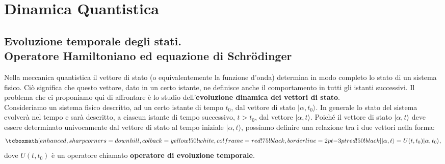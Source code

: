 \documentclass[a4paper,12pt,oneside]{book}
\newcommand*{\myfont}{\fontfamily{ppl}\selectfont}
\begin{document}
\fancypagestyle{plain}{%
\fancyhf{} %
\fancyfoot[C]{\bfseries \myfont{\thepage}} %
\renewcommand{\headrulewidth}{0pt}
\renewcommand{\footrulewidth}{0pt}}

\fancypagestyle{VS}{
\headheight = 15pt
\lhead[\myfont{\textit{\textbf{\thechapter\nouppercase{\leftmark}}}}]{\myfont{\textit{\textbf{\nouppercase{\leftmark}}}}}
\chead[]{}
\rhead[\myfont{\textbf{\thepage}}]{\myfont{\textbf{\thepage}}}

\lfoot[]{}
\cfoot[]{}
\rfoot[]{}
}



\pagestyle{VS}
\setcounter{chapter}{7}
\setcounter{page}{91}
\chapter{Dinamica Quantistica}
\section[Evoluzione temporale degli stati]{Evoluzione temporale degli stati.\\Operatore Hamiltoniano ed equazione di Schr\"{o}dinger}
Nella meccanica quantistica il vettore di stato (o equivalentemente la funzione d'onda) determina in modo completo lo stato di un sistema fisico. Ciò significa che questo vettore, dato in un certo istante, ne definisce anche il comportamento in tutti gli istanti successivi. Il problema che ci proponiamo qui di affrontare è lo studio dell'\textbf{evoluzione dinamica dei vettori di stato}.\\

Consideriamo un sistema fisico descritto, ad un certo istante di tempo $t_0$, dal vettore di stato $\vert \alpha, t_0 \rangle$. In generale lo stato del sistema evolverà nel tempo e sarà descritto, a ciascun istante di tempo successivo, $t>t_0$, dal vettore $\vert \alpha, t\rangle$. Poiché il vettore di stato $\vert \alpha, t \rangle$ deve essere determinato univocamente dal vettore di stato al tempo iniziale $\vert \alpha, t \rangle$, possiamo definire una relazione tra i due vettori nella forma:
	\begin{equation}
		\tcboxmath[enhanced, sharp corners=downhill, colback=yellow!50!white, colframe=red!75!black, borderline={2pt}{-3pt}{red!50!black}]{	
			\vert \alpha, t \rangle = U(t,t_0)\vert \alpha, t_0 \rangle,
			}
	\end{equation}
dove $U(t,t_0)$ è un operatore chiamato \textbf{operatore di evoluzione temporale}.\\
\end{document}
